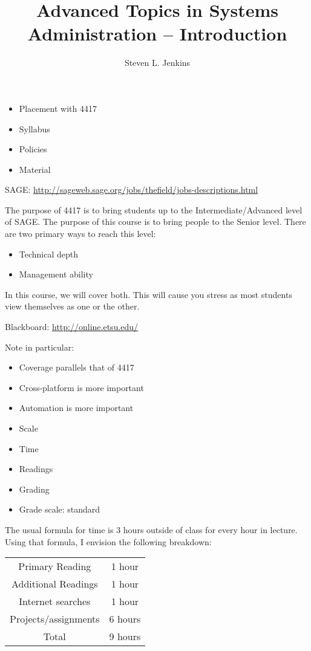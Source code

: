 \documentclass{slides}
\title{Advanced Topics in Systems Administration -- Introduction}
\author{Steven L. Jenkins}
\newcommand{\bi}{\begin{itemize}}
\newcommand{\ei}{\end{itemize}}
\begin{document}
\maketitle


\bi
\item Placement with 4417
\item Syllabus
\item Policies
\item Material
\ei


SAGE: \url{http://sageweb.sage.org/jobs/thefield/jobs-descriptions.html}

The purpose of 4417 is to bring students up to the 
Intermediate/Advanced level of SAGE.  The purpose of this
course is to bring people to the Senior level.  There are two
primary ways to reach this level:

\bi
\item Technical depth
\item Management ability
\ei

In this course, we will cover both.  This will cause you
stress as most students view themselves as one or the other.


Blackboard: \url{http://online.etsu.edu/}

Note in particular:

\bi
\item Coverage parallels that of 4417
\item Cross-platform is more important
\item Automation is more important
\item Scale
\ei


\bi
\item Time
\item Readings
\item Grading
\item Grade scale: standard
\ei


The usual formula for time is 3 hours outside of class for every hour
in lecture.  Using that formula, I envision the following breakdown:

\begin{tabular}{c|c}
Primary Reading & 1 hour\\
Additional Readings & 1 hour\\
Internet searches & 1 hour\\
Projects/assignments & 6 hours\\
\hline
Total & 9 hours
\end{tabular}
\end{document}
